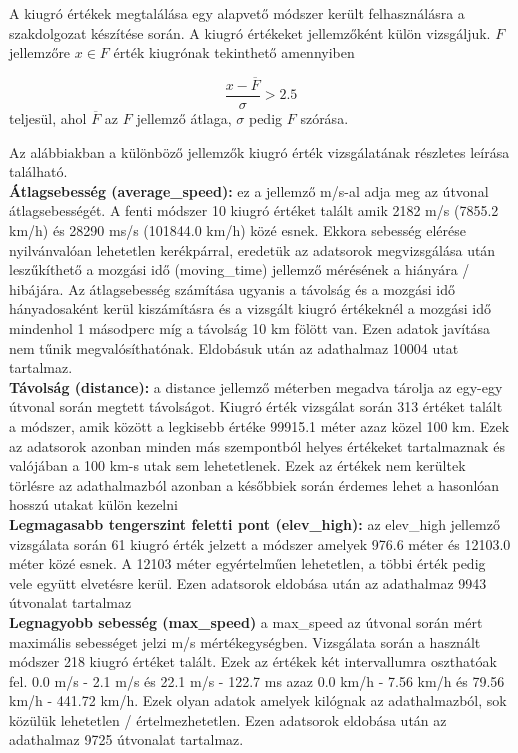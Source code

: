 A kiugró értékek megtalálása egy alapvető módszer került felhasználásra a szakdolgozat készítése során. A kiugró értékeket jellemzőként külön vizsgáljuk. $F$ jellemzőre $x \in F$ érték kiugrónak tekinthető amennyiben

\[  \frac{x - \overline{F}}{\sigma} > 2.5\]
teljesül, ahol $\overline{F}$ az $F$ jellemző átlaga, $\sigma$ pedig $F$ szórása.

Az alábbiakban a különböző jellemzők kiugró érték vizsgálatának részletes leírása található.\\[6pt]

\textbf{Átlagsebesség (average\_speed):}
ez a jellemző m/s-al adja meg az útvonal átlagsebességét. A fenti módszer 10 kiugró értéket talált amik 2182 m/s (7855.2 km/h) és 28290 ms/s (101844.0 km/h) közé esnek. Ekkora sebesség elérése nyilvánvalóan lehetetlen kerékpárral, eredetük az adatsorok megvizsgálása után leszűkíthető a mozgási idő (moving\_time) jellemző mérésének a hiányára / hibájára. Az átlagsebesség számítása ugyanis a távolság és a mozgási idő hányadosaként kerül kiszámításra és a vizsgált kiugró értékeknél a mozgási idő mindenhol 1 másodperc míg a távolság 10 km fölött van. Ezen adatok javítása nem tűnik megvalósíthatónak. Eldobásuk után az adathalmaz 10004 utat tartalmaz.\\[6pt]

\textbf{Távolság (distance):}
a distance jellemző méterben megadva tárolja az egy-egy útvonal során megtett távolságot. Kiugró érték vizsgálat során 313 értéket talált a módszer, amik között a legkisebb értéke 99915.1 méter azaz közel 100 km. Ezek az adatsorok azonban minden más szempontból helyes értékeket tartalmaznak és valójában a 100 km-s utak sem lehetetlenek. Ezek az értékek nem kerültek törlésre az adathalmazból azonban a későbbiek során érdemes lehet a hasonlóan hosszú utakat külön kezelni\\[6pt]

\textbf{Legmagasabb tengerszint feletti pont (elev\_high):}
az elev\_high jellemző vizsgálata során 61 kiugró érték jelzett a módszer amelyek 976.6 méter és 12103.0 méter közé esnek. A 12103 méter egyértelműen lehetetlen, a többi érték pedig vele együtt elvetésre kerül. Ezen adatsorok eldobása után az adathalmaz 9943 útvonalat tartalmaz\\[6pt]

\textbf{Legnagyobb sebesség (max\_speed)}
a max\_speed az útvonal során mért maximális sebességet jelzi m/s mértékegységben. Vizsgálata során a használt módszer 218 kiugró értéket talált. Ezek az értékek két intervallumra oszthatóak fel. 0.0 m/s - 2.1 m/s és 22.1 m/s - 122.7 ms azaz 0.0 km/h - 7.56 km/h és 79.56 km/h - 441.72 km/h. Ezek olyan adatok amelyek kilógnak az adathalmazból, sok közülük lehetetlen / értelmezhetetlen. Ezen adatsorok eldobása után az adathalmaz 9725 útvonalat tartalmaz.\\[6pt]

